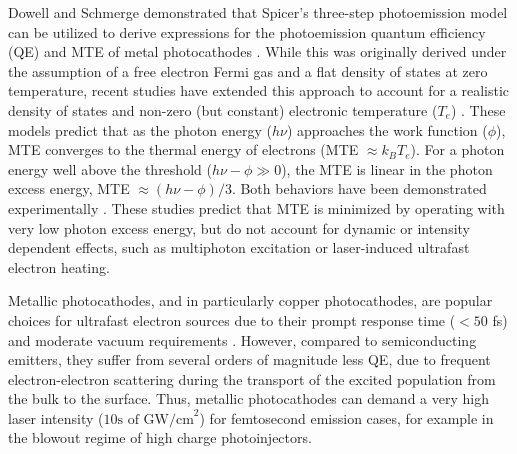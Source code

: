 

Dowell and Schmerge demonstrated that Spicer's three-step photoemission model \cite{spicer1964} can be utilized to derive expressions for the photoemission quantum efficiency (QE) and MTE of metal photocathodes \cite{dowell2009_QuantumEfficiencyThermal}. While this was originally derived under the assumption of a free electron Fermi gas and a flat density of states at zero temperature,  recent studies have extended this approach to account for a realistic density of states and non-zero (but constant) electronic temperature ($T_e$) \cite{Dimitrov2017,Feng2015}. These models predict that as the photon energy ($h\nu$) approaches the work function ($\phi$), MTE converges to the thermal energy of electrons (MTE $\approx k_B T_e$). For a photon energy well above the threshold ($h\nu - \phi \gg 0$), the MTE is linear in the photon excess energy, MTE $ \approx (h\nu-\phi)/3$. Both behaviors have been demonstrated experimentally \cite{Feng2015}.  These studies predict that MTE is minimized by operating with very low photon excess energy, but do not account for dynamic or intensity dependent effects, such as multiphoton excitation or laser-induced ultrafast electron heating.


Metallic photocathodes, and in particularly copper photocathodes, are popular choices for ultrafast electron sources due to their prompt response time ($<50$ fs) and moderate vacuum requirements \cite{ttm,plasmon}. However, compared to semiconducting emitters, they suffer from several orders of magnitude less QE, due to frequent electron-electron scattering  during the transport of the excited population from the bulk to the surface. Thus, metallic photocathodes can demand a very high laser intensity   ($\textrm{10s of GW/cm}^2$) for femtosecond emission cases, for example in the blowout regime \cite{blowout} of high charge photoinjectors.

